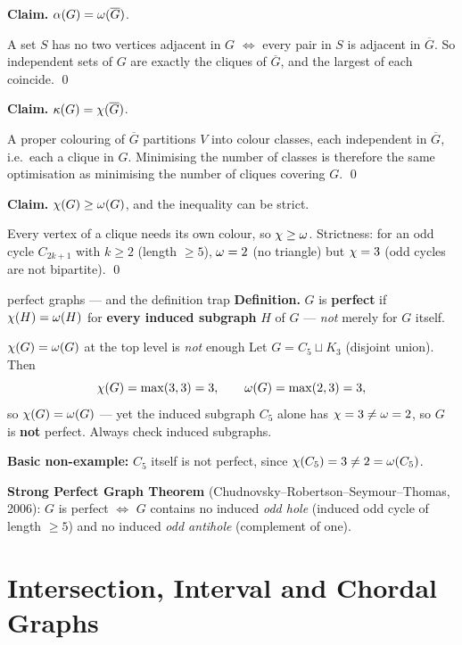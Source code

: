 \begin{correct}
\textbf{Claim.} $\alpha(G)=\omega(\overline G)$.

\prf A set $S$ has no two vertices adjacent in $G$ $\iff$ every pair in $S$ is adjacent in
$\overline G$. So independent sets of $G$ are exactly the cliques of $\overline G$, and the
largest of each coincide. \qed

\smallskip
\textbf{Claim.} $\kappa(G)=\chi(\overline G)$.

\prf A proper colouring of $\overline G$ partitions $V$ into colour classes, each independent in
$\overline G$, i.e.\ each a clique in $G$. Minimising the number of classes is therefore the same
optimisation as minimising the number of cliques covering $G$. \qed

\smallskip
\textbf{Claim.} $\chi(G)\ge\omega(G)$, and the inequality can be strict.

\prf Every vertex of a clique needs its own colour, so $\chi\ge\omega$. Strictness: for an odd
cycle $C_{2k+1}$ with $k\ge2$ (length $\ge5$), $\omega=2$ (no triangle) but $\chi=3$ (odd cycles
are not bipartite). \qed
\end{correct}

\begin{facts}{perfect graphs --- and the definition trap}
\textbf{Definition.} $G$ is \textbf{perfect} if $\chi(H)=\omega(H)$ for \textbf{every induced
subgraph} $H$ of $G$ --- \emph{not} merely for $G$ itself.
\end{facts}

\begin{trap}{$\chi(G)=\omega(G)$ at the top level is \emph{not} enough}
Let $G=C_5\sqcup K_3$ (disjoint union). Then
\[
  \chi(G)=\max(3,3)=3,\qquad \omega(G)=\max(2,3)=3,
\]
so $\chi(G)=\omega(G)$ --- yet the induced subgraph $C_5$ alone has $\chi=3\ne\omega=2$, so $G$ is
\textbf{not} perfect. Always check induced subgraphs.

\textbf{Basic non-example:} $C_5$ itself is not perfect, since $\chi(C_5)=3\ne2=\omega(C_5)$.

\textbf{Strong Perfect Graph Theorem} (Chudnovsky--Robertson--Seymour--Thomas, 2006): $G$ is
perfect $\iff$ $G$ contains no induced \emph{odd hole} (induced odd cycle of length $\ge5$) and no
induced \emph{odd antihole} (complement of one).
\end{trap}

\section{Intersection, Interval and Chordal Graphs}

